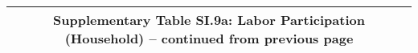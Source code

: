 \begin{longtable}{llcccccccccc}
\multicolumn{12}{c}{{\bfseries Supplementary Table SI.9a: Labor Participation (Household) -- continued from previous page}} \\ \hline                                                                                                                                                                                                                                                                                                                                                                                                                                                                                                                                                                                                                                                                                                                                                     

\end{longtable}
